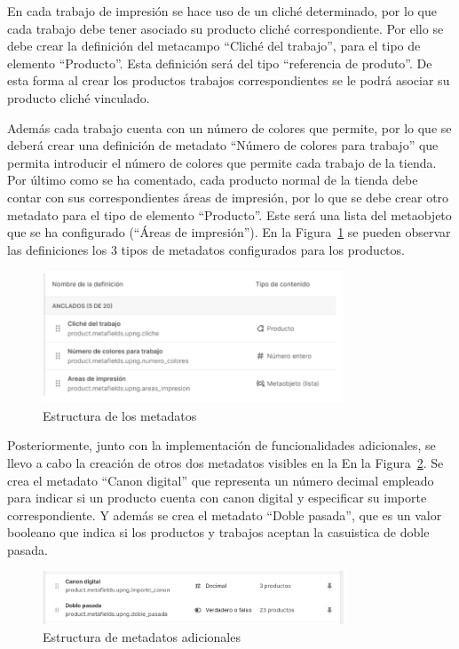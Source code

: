 \documentclass[11pt]{article}
\begin{document}
En cada trabajo de impresión se hace uso de un cliché determinado, por lo que cada trabajo debe tener asociado su producto cliché correspondiente. Por ello se debe 
crear la definición del metacampo ``Cliché del trabajo'', para el tipo de elemento ``Producto''. Esta definición será del tipo ``referencia de produto''. De esta forma al crear los productos trabajos correspondientes se le podrá asociar su producto cliché vinculado.

Además cada trabajo cuenta con un número de colores que permite, por lo que se deberá crear una definición de metadato ``Número de colores para trabajo'' que permita
introducir el número de colores que permite cada trabajo de la tienda. Por último como se ha comentado, cada producto normal de la tienda debe contar con sus correspondientes áreas de impresión, por lo que se debe crear otro metadato para el tipo de elemento ``Producto''. Este será una 
lista del metaobjeto que se ha configurado (``Áreas de impresión''). En la Figura~\ref{fig:metadatos} se pueden observar las definiciones los 3 tipos de metadatos configurados para los productos.

\begin{figure}[H]
    \centering
    \includegraphics[width=0.8\textwidth]{imagenesUS2/creacionMetafields.png}
    \caption{\label{fig:metadatos}Estructura de los metadatos}
    \vspace{\fill}
\end{figure}

Posteriormente, junto con la implementación de funcionalidades adicionales, se llevo a cabo la creación de otros dos metadatos visibles en la En la Figura~\ref{fig:metafieldsAdicionales}. 
Se crea el metadato  ``Canon digital'' que representa un número decimal empleado para indicar si un producto cuenta con canon digital y especificar su importe correspondiente. Y además
se crea el metadato ``Doble pasada'', que es un valor booleano que indica si los productos y trabajos aceptan la casuistica de doble pasada.

\begin{figure}[H]
    \centering
    \includegraphics[width=0.8\textwidth]{imagenesUS2/metafieldsAdicionales.png}
    \caption{\label{fig:metafieldsAdicionales}Estructura de metadatos adicionales}
    \vspace{\fill}
\end{figure}
\end{document}
